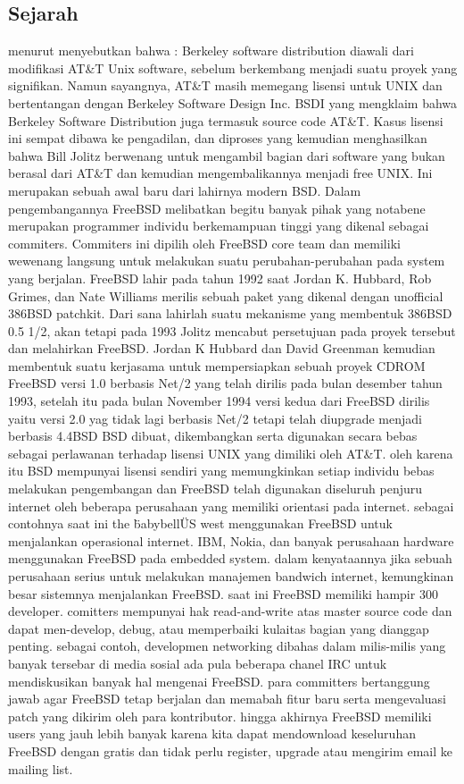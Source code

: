 \subsection{Sejarah}
	menurut \cite{luanmembangun} menyebutkan bahwa :
	Berkeley software distribution diawali dari modifikasi AT\&T Unix software, sebelum berkembang menjadi suatu proyek yang signifikan. Namun sayangnya, AT\&T masih memegang lisensi untuk UNIX dan bertentangan dengan Berkeley Software Design Inc. BSDI yang mengklaim bahwa Berkeley Software Distribution juga termasuk source code AT\&T.
	Kasus lisensi ini sempat dibawa ke pengadilan, dan diproses yang kemudian  menghasilkan bahwa Bill Jolitz berwenang untuk mengambil bagian dari software yang bukan berasal dari AT\&T dan kemudian mengembalikannya menjadi free UNIX. Ini merupakan sebuah awal baru dari lahirnya modern BSD.
	Dalam pengembangannya FreeBSD melibatkan begitu banyak pihak yang notabene merupakan programmer individu berkemampuan tinggi yang dikenal sebagai commiters. Commiters ini dipilih oleh FreeBSD core team dan memiliki wewenang langsung untuk melakukan suatu perubahan-perubahan pada system yang  berjalan.
	FreeBSD lahir pada tahun 1992 saat Jordan K. Hubbard, Rob Grimes, dan Nate Williams merilis sebuah paket yang dikenal dengan unofficial 386BSD patchkit. Dari sana lahirlah suatu mekanisme yang membentuk 386BSD 0.5 1/2, akan tetapi pada 1993 Jolitz mencabut persetujuan pada proyek tersebut dan melahirkan FreeBSD. 
	Jordan K Hubbard dan David Greenman kemudian membentuk suatu kerjasama untuk mempersiapkan sebuah proyek CDROM FreeBSD versi 1.0 berbasis Net/2 yang telah dirilis pada bulan desember tahun 1993, setelah itu pada bulan November 1994 versi kedua dari FreeBSD dirilis yaitu versi 2.0 yag tidak lagi 
	berbasis Net/2 tetapi telah diupgrade menjadi berbasis 4.4BSD BSD dibuat, dikembangkan serta digunakan secara bebas sebagai perlawanan terhadap lisensi UNIX yang dimiliki oleh AT\&T. oleh karena itu BSD mempunyai lisensi sendiri yang memungkinkan setiap individu bebas melakukan pengembangan dan
	FreeBSD telah digunakan diseluruh penjuru internet oleh beberapa perusahaan yang memiliki orientasi pada internet. sebagai contohnya saat ini the \"babybell\" US west menggunakan FreeBSD untuk menjalankan operasional internet. IBM, Nokia, dan banyak perusahaan hardware menggunakan FreeBSD pada embedded system.
	dalam kenyataannya jika sebuah perusahaan serius untuk melakukan manajemen bandwich internet, kemungkinan besar sistemnya menjalankan FreeBSD.
	saat ini FreeBSD memiliki hampir 300 developer. comitters mempunyai hak read-and-write atas master source code dan dapat men-develop, debug, atau memperbaiki kulaitas bagian yang dianggap penting.
	sebagai contoh, developmen networking dibahas dalam milis-milis yang banyak tersebar di media sosial ada pula beberapa chanel IRC untuk mendiskusikan banyak hal mengenai FreeBSD.
	para committers bertanggung jawab agar FreeBSD tetap berjalan dan memabah fitur baru serta mengevaluasi patch yang dikirim oleh para kontributor. 
	hingga akhirnya FreeBSD memiliki users yang jauh lebih banyak karena kita dapat mendownload keseluruhan FreeBSD dengan gratis dan tidak perlu register, upgrade atau mengirim email ke mailing list.

